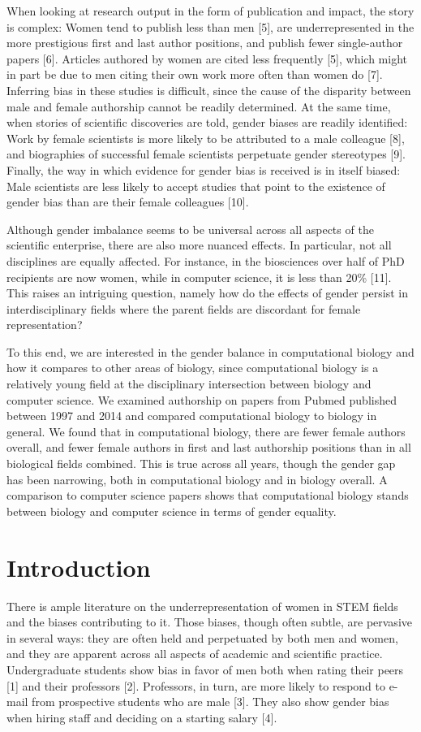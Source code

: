 \documentclass[10pt,letterpaper]{article}
\begin{document}
\begin{flushleft}
When looking at research output in the form of publication and impact, the story is complex: Women tend to publish less than men [5], are underrepresented in the more prestigious first and last author positions, and publish fewer single-author papers [6]. Articles authored by women are cited less frequently [5], which might in part be due to men citing their own work more often than women do [7]. Inferring bias in these studies is difficult, since the cause of the disparity between male and female authorship cannot be readily determined. At the same time, when stories of scientific discoveries are told, gender biases are readily identified: Work by female scientists is more likely to be attributed to a male colleague [8], and biographies of successful female scientists perpetuate gender stereotypes [9]. Finally, the way in which evidence for gender bias is received is in itself biased:  Male scientists are less likely to accept studies that point to the existence of gender bias than are their female colleagues [10].

Although gender imbalance seems to be universal across all aspects of the scientific enterprise, there are also more nuanced effects. In particular, not all disciplines are equally affected. For instance, in the biosciences over half of PhD recipients are now women, while in computer science, it is less than 20\% [11]. This raises an intriguing question, namely how do the effects of gender persist in interdisciplinary fields where the parent fields are discordant for female representation?

To this end, we are interested in the gender balance in computational biology and how it compares to other areas of biology, since computational biology is a relatively young field at the disciplinary intersection between biology and computer science. We examined authorship on papers from Pubmed published between 1997 and 2014 and compared computational biology to biology in general. We found that in computational biology, there are fewer female authors overall, and fewer female authors in first and last authorship positions than in all biological fields combined. This is true across all years, though the gender gap has been narrowing, both in computational biology and in biology overall. A comparison to computer science papers shows that computational biology stands between biology and computer science in terms of gender equality.

\section*{Introduction}
There is ample literature on the underrepresentation of women in STEM fields and the biases contributing to it. Those biases, though often subtle, are pervasive in several ways: they are often held and perpetuated by both men and women, and they are apparent across all aspects of academic and scientific practice. Undergraduate students show bias in favor of men both when rating their peers [1] and their professors [2]. Professors, in turn, are more likely to respond to e-mail from prospective students who are male [3]. They also show gender bias when hiring staff and deciding on a starting salary [4].


\end{flushleft}
\end{document}
